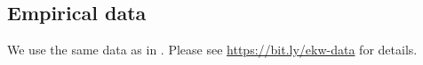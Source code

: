 \subsection{Empirical data}\label{Empirical data}
We use the same data as in \citet{Keane.1997}. Please see \url{https://bit.ly/ekw-data} for details.
